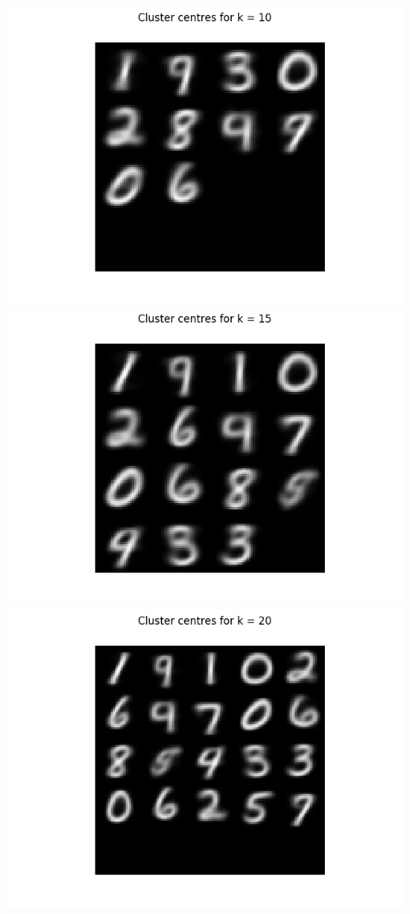 \documentclass{article}
\begin{document}
\begin{center}
\\
\includegraphics[trim=3cm 0 0 0, scale=0.4]{images/task1_6_imgs_10.png}
\includegraphics[trim=3cm 0 0 0, scale=0.4]{images/task1_6_imgs_15.png}
\includegraphics[trim=3cm 0 3cm 0, scale=0.4]{images/task1_6_imgs_20.png}

\end{center}
\end{document}
